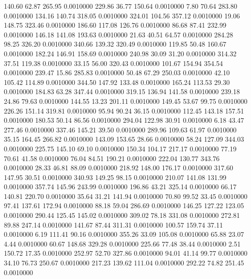  140.60   62.87  265.95   0.0010000
 229.86   36.77  150.64   0.0010000
   7.80   70.64  283.80   0.0010000
 134.16  140.74  318.05   0.0010000
 324.01  104.56  357.12   0.0010000
  19.06  148.75  323.46   0.0010000
 186.60  117.08  126.76   0.0010000
  86.68   87.41  232.99   0.0010000
 146.18  141.08  193.63   0.0010000
  21.63   40.51   64.57   0.0010000
 284.28   98.25  326.20   0.0010000
 340.66  139.32  320.49   0.0010000
 119.85   50.48  160.67   0.0010000
 182.24  146.91  158.69   0.0010000
 240.98   30.09   31.20   0.0010000
 314.32   37.51  119.38   0.0010000
  33.15   56.00  320.43   0.0010000
 101.67  154.94  354.54   0.0010000
 239.47   15.86  285.83   0.0010000
  50.48   67.29  250.03   0.0010000
  42.10  105.42  114.89   0.0010000
 344.50  147.92  133.48   0.0010000
 165.24  113.53   29.30   0.0010000
 184.83   63.28  347.44   0.0010000
 319.15  136.94  141.58   0.0010000
 239.18   24.86   79.63   0.0010000
 144.55   13.23  201.11   0.0010000
 149.45   53.67   99.75   0.0010000
 226.26  151.14  319.81   0.0010000
  95.94   90.24   36.15   0.0010000
 112.45  143.18  157.51   0.0010000
 180.53   50.14   86.56   0.0010000
 294.04  122.98   30.91   0.0010000
   6.18   43.47  277.46   0.0010000
 337.46  145.21   39.50   0.0010000
 289.96  109.63   61.97   0.0010000
  35.15  164.45  266.82   0.0010000
 143.09  153.65   28.66   0.0010000
  58.24  127.09  344.03   0.0010000
 225.75  145.10   69.10   0.0010000
 150.34  104.17  217.17   0.0010000
  77.19   70.61   41.58   0.0010000
  76.04   84.51  190.21   0.0010000
 222.04  130.77  343.76   0.0010000
  28.33   46.81   88.09   0.0010000
 218.92  148.00  176.17   0.0010000
 317.60  147.95   30.51   0.0010000
 340.93  149.25   98.15   0.0010000
 210.07  141.08  131.99   0.0010000
 357.74  145.96  243.99   0.0010000
 196.86   43.21  325.14   0.0010000
  66.17  140.81  220.70   0.0010000
  35.64   31.21  141.94   0.0010000
  70.80   99.52   33.45   0.0010000
  97.41  137.61  172.94   0.0010000
  88.18   59.04  286.69   0.0010000
 146.25  127.22  123.05   0.0010000
 290.44  125.45  145.02   0.0010000
 309.02   78.18  331.08   0.0010000
 272.81   89.88  247.14   0.0010000
 141.67   87.44  311.31   0.0010000
 100.57  159.74   37.11   0.0010000
   6.19  111.41   90.16   0.0010000
 355.26   33.09  105.08   0.0010000
  65.88   23.07    4.44   0.0010000
  60.67  148.68  329.28   0.0010000
 225.66   77.48   38.44   0.0010000
   2.51  150.72   17.35   0.0010000
 252.97   52.70  327.86   0.0010000
  94.01   41.14   99.77   0.0010000
  34.10   76.73  250.67   0.0010000
 217.23  139.62  111.04   0.0010000
 292.22   74.82  251.45   0.0010000
